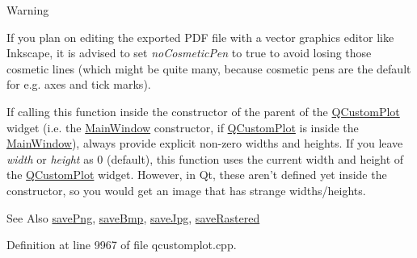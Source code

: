 \begin{DoxyWarning}{Warning}
\begin{DoxyItemize}
\item If you plan on editing the exported P\-D\-F file with a vector graphics editor like Inkscape, it is advised to set {\itshape no\-Cosmetic\-Pen} to true to avoid losing those cosmetic lines (which might be quite many, because cosmetic pens are the default for e.\-g. axes and tick marks). \item If calling this function inside the constructor of the parent of the \hyperlink{class_q_custom_plot}{Q\-Custom\-Plot} widget (i.\-e. the \hyperlink{class_main_window}{Main\-Window} constructor, if \hyperlink{class_q_custom_plot}{Q\-Custom\-Plot} is inside the \hyperlink{class_main_window}{Main\-Window}), always provide explicit non-\/zero widths and heights. If you leave {\itshape width} or {\itshape height} as 0 (default), this function uses the current width and height of the \hyperlink{class_q_custom_plot}{Q\-Custom\-Plot} widget. However, in Qt, these aren't defined yet inside the constructor, so you would get an image that has strange widths/heights.\end{DoxyItemize}

\end{DoxyWarning}
\begin{DoxySeeAlso}{See Also}
\hyperlink{class_q_custom_plot_a7636261aff1f6d25c9da749ece3fc8b8}{save\-Png}, \hyperlink{class_q_custom_plot_a6629d9e8e6da4bf18055ee0257fdce9a}{save\-Bmp}, \hyperlink{class_q_custom_plot_a490c722092d1771e8ce4a7a73dfd84ab}{save\-Jpg}, \hyperlink{class_q_custom_plot_ab528b84cf92baabe29b1d0ef2f77c93e}{save\-Rastered} 
\end{DoxySeeAlso}


Definition at line 9967 of file qcustomplot.\-cpp.

